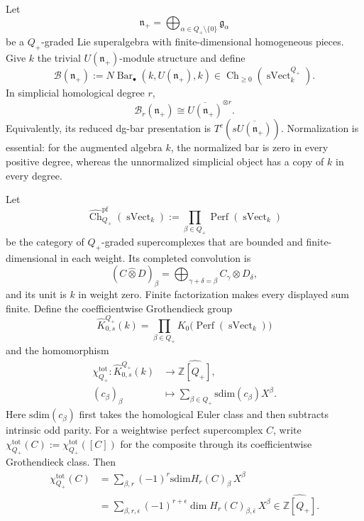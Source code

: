 \documentclass[11pt,reqno]{amsart}
\theoremstyle{definition}
\theoremstyle{remark}
\providecommand{\sdim}{\mathrm{sdim}}
\newcommand{\Barc}{\operatorname{Bar}}
\begin{document}
Let
\[
 \mathfrak n_+
 =\bigoplus_{\alpha\in Q_+\setminus\{0\}}\mathfrak g_\alpha
\]
be a \(Q_+\)-graded Lie superalgebra with finite-dimensional
homogeneous pieces.  Give \(k\) the trivial
\(U(\mathfrak n_+)\)-module structure and define
\[
 \mathcal B(\mathfrak n_+)
 :=
 N\Barc_\bullet(k,U(\mathfrak n_+),k)
 \in
 \operatorname{Ch}_{\ge0}
   (\operatorname{sVect}^{Q_+}_k).
\]
In simplicial homological degree \(r\),
\[
 \mathcal B_r(\mathfrak n_+)
 \cong\overline{U(\mathfrak n_+)}^{\otimes r}.
\]
Equivalently, its reduced dg-bar presentation is
\(T^c(s\overline{U(\mathfrak n_+)})\).
Normalization is essential: for the augmented algebra \(k\), the
normalized bar is zero in every positive degree, whereas the
unnormalized simplicial object has a copy of \(k\) in every degree.

Let
\[
 \widehat{\operatorname{Ch}}^{\mathrm{pf}}_{Q_+}
   (\operatorname{sVect}_k)
 :=
 \prod_{\beta\in Q_+}
   \operatorname{Perf}(\operatorname{sVect}_k)
\]
be the category of \(Q_+\)-graded supercomplexes that are bounded and
finite-dimensional in each weight.  Its completed convolution is
\[
 (C\widehat\otimes D)_\beta
 =\bigoplus_{\gamma+\delta=\beta}C_\gamma\otimes D_\delta,
\]
and its unit is \(k\) in weight zero.  Finite factorization makes every
displayed sum finite.  Define the coefficientwise Grothendieck group
\[
 \widehat K_{0,s}^{Q_+}(k)
 =\prod_{\beta\in Q_+}
 K_0\bigl(\operatorname{Perf}(\operatorname{sVect}_k)\bigr)
\]
and the homomorphism
\[
 \begin{aligned}
 \chi_{Q_+}^{\mathrm{tot}}:
 \widehat K_{0,s}^{Q_+}(k)&\longrightarrow
 \widehat{\mathbb Z[Q_+]},\\
 (c_\beta)_\beta&\longmapsto
 \sum_{\beta\in Q_+}\sdim(c_\beta)X^\beta.
 \end{aligned}
\]
Here \(\sdim(c_\beta)\) first takes the homological Euler class and
then subtracts intrinsic odd parity.  For a weightwise perfect
supercomplex \(C\), write
\(
 \chi_{Q_+}^{\mathrm{tot}}(C)
 :=\chi_{Q_+}^{\mathrm{tot}}([C])
\)
for the composite through its coefficientwise Grothendieck class.
Then
\[
 \begin{split}
 \chi_{Q_+}^{\mathrm{tot}}(C)
 &=
 \sum_{\beta,r}(-1)^r
 \sdim H_r(C)_\beta\,X^\beta\\
 &=
 \sum_{\beta,r,\epsilon}(-1)^{r+\epsilon}
 \dim H_r(C)_{\beta,\bar\epsilon}\,X^\beta
 \in\widehat{\mathbb Z[Q_+]}.
 \end{split}
\]
\end{document}

